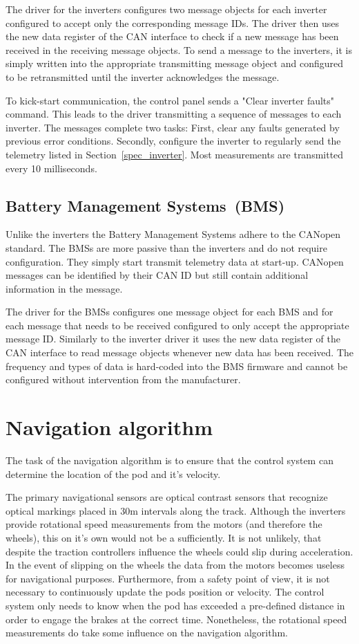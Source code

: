 The driver for the inverters configures two message objects for each inverter configured to accept only the corresponding message IDs. The driver then uses the new data register of the CAN interface to check if a new message has been received in the receiving message objects. To send a message to the inverters, it is simply written into the appropriate transmitting message object and configured to be retransmitted until the inverter acknowledges the message.

To kick-start communication, the control panel sends a "Clear inverter faults" command. This leads to the driver transmitting a sequence of messages to each inverter. The messages complete two tasks: First, clear any faults generated by previous error conditions. Secondly, configure the inverter to regularly send the telemetry listed in Section~\ref{spec_inverter}. Most measurements are transmitted every 10 milliseconds.

\subsection{Battery Management Systems (BMS)}

Unlike the inverters the Battery Management Systems adhere to the CANopen standard. The BMSs are more passive than the inverters and do not require configuration. They simply start transmit telemetry data at start-up. CANopen messages can be identified by their CAN ID but still contain additional information in the message.

The driver for the BMSs configures one message object for each BMS and for each message that needs to be received configured to only accept the appropriate message ID. Similarly to the inverter driver it uses the new data register of the CAN interface to read message objects whenever new data has been received. The frequency and types of data is hard-coded into the BMS firmware and cannot be configured without intervention from the manufacturer.

\section{Navigation algorithm}

The task of the navigation algorithm is to ensure that the control system can determine the location of the pod and it's velocity.

The primary navigational sensors are optical contrast sensors that recognize optical markings placed in 30m intervals along the track. Although the inverters provide rotational speed measurements from the motors (and therefore the wheels), this on it's own would not be a sufficiently. It is not unlikely, that despite the traction controllers influence the wheels could slip during acceleration. In the event of slipping on the wheels the data from the motors becomes useless for navigational purposes. Furthermore, from a safety point of view, it is not necessary to continuously update the pods position or velocity. The control system only needs to know when the pod has exceeded a pre-defined distance in order to engage the brakes at the correct time. Nonetheless, the rotational speed measurements do take some influence on the navigation algorithm.

